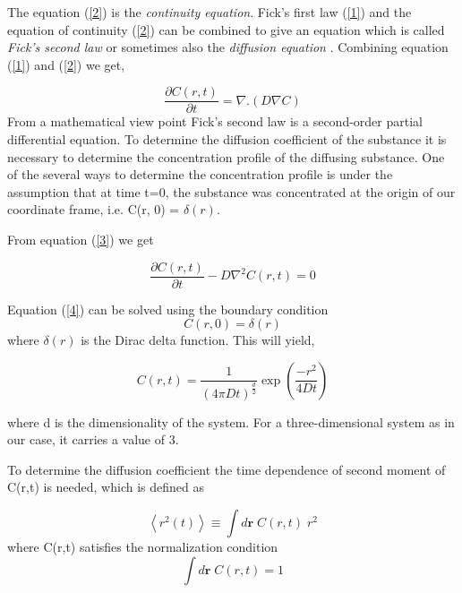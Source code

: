  \noindent The equation (\ref{2}) is the \emph{continuity equation}. Fick's first law (\ref{1}) and the equation of continuity (\ref{2}) can be combined to give an equation which is called \emph{Fick's second law} or sometimes also the \emph{diffusion equation} \cite{leach}. Combining equation (\ref{1}) and (\ref{2}) we get, 
 
 \begin{equation}\label{3}
 \frac{\partial C(r,t)}{\partial t} = \nabla .(D \nabla C)
 \end{equation}
 \noindent From a mathematical view point Fick's second law is a second-order partial differential equation. To determine the diffusion coefficient of the substance it is necessary to determine the concentration profile of the diffusing substance. One of the several ways to determine the concentration profile is under the assumption that at time t=0, the substance was concentrated at the origin of our coordinate frame, i.e. C(r, 0) = $\delta(r)$.
 
 \noindent From equation (\ref{3}) we get
 
 \begin{equation}\label{4}
 \frac{\partial C(r,t)}{\partial t} -D \nabla^{2} C(r,t) = 0
 \end{equation}
 
 \noindent Equation (\ref{4}) can be solved using the boundary condition
 \begin{equation}
 C(r,0) = \delta(r)
 \end{equation}
 where $\delta(r)$ is the Dirac delta function. This will yield,
 
 \begin{equation}
 C(r,t) =\frac{1}{(4 \pi D t)^{\frac{d}{2}}} \exp{\left(\frac{-r^2}{4 D t}\right)}
 \end{equation}
 
 \noindent where d is the dimensionality of the system. For a three-dimensional system as in our case, it carries a value of $3$.
 
 \noindent To determine the diffusion coefficient the time dependence of second moment of C(r,t) is needed, which is defined as
 
 \begin{equation}\label{7}
 \left\langle r^2(t)\right\rangle \equiv \int d \textbf{r} \; C(r,t)\;r^2 
 \end{equation}
 \noindent where C(r,t) satisfies the normalization condition
  \begin{equation}\label{8}
  \int d\mathbf{r}\;C(r,t) =1
  \end{equation}
 
